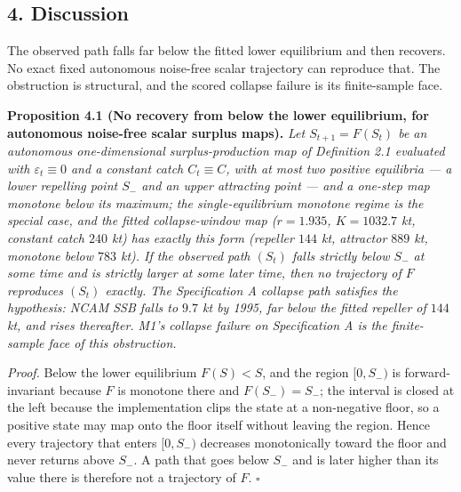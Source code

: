 \documentclass[11pt]{article}
\begin{document}
\subsection{4. Discussion}\label{discussion}

The observed path falls far below the fitted lower equilibrium and then
recovers. No exact fixed autonomous noise-free scalar trajectory can
reproduce that. The obstruction is structural, and the scored collapse
failure is its finite-sample face.

\textbf{Proposition 4.1 (No recovery from below the lower equilibrium,
for autonomous noise-free scalar surplus maps).} \emph{Let
\(S_{t+1}=F(S_t)\) be an autonomous one-dimensional surplus-production
map of Definition 2.1 evaluated with \(\varepsilon_t \equiv 0\) and a
constant catch \(C_t \equiv C\), with at most two positive equilibria --- a lower
repelling point \(S_-\) and an upper attracting point --- and a one-step
map monotone below its maximum; the single-equilibrium monotone regime
is the special case, and the fitted collapse-window map (\(r = 1.935\),
\(K = 1032.7\) kt, constant catch \(240\) kt) has exactly this form
(repeller \(144\) kt, attractor \(889\) kt, monotone below \(783\) kt).
If the observed path \((S_t)\) falls strictly below \(S_-\) at some
time and is strictly larger at some later time, then no trajectory of
\(F\) reproduces \((S_t)\) exactly. The Specification A collapse path
satisfies the hypothesis: NCAM SSB falls to \(9.7\) kt by 1995, far
below the fitted repeller of \(144\) kt, and rises thereafter. M1's
collapse failure on Specification A is the finite-sample face of this
obstruction.}

\emph{Proof.} Below the lower equilibrium \(F(S) < S\), and the region
\([0, S_-)\) is forward-invariant because \(F\) is monotone there and
\(F(S_-) = S_-\); the interval is closed at the left because the
implementation clips the state at a non-negative floor, so a positive
state may map onto the floor itself without leaving the region. Hence
every trajectory that enters \([0, S_-)\) decreases monotonically
toward the floor and never returns above \(S_-\). A path that goes
below \(S_-\) and is later higher than its value there is therefore
not a trajectory of \(F\). \ensuremath{\square}
\end{document}

